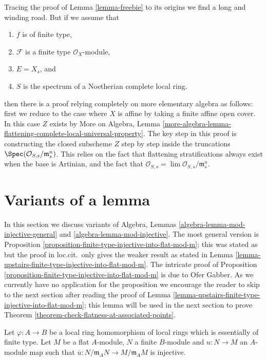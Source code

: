 \begin{remark}
\label{remark-flattening-complete-noetherian}
Tracing the proof of
Lemma \ref{lemma-freebie}
to its origins we find a long and winding road. But if we assume that
\begin{enumerate}
\item $f$ is of finite type,
\item $\mathcal{F}$ is a finite type $\mathcal{O}_X$-module,
\item $E = X_s$, and
\item $S$ is the spectrum of a Noetherian complete local ring.
\end{enumerate}
then there is a proof relying completely on more elementary algebra as
follows: first we reduce to the case where $X$ is affine by taking
a finite affine open cover. In this case $Z$ exists by
More on Algebra,
Lemma \ref{more-algebra-lemma-flattening-complete-local-universal-property}.
The key step in this proof is constructing the closed subscheme $Z$
step by step inside the truncations
$\Spec(\mathcal{O}_{S, s}/\mathfrak m_s^n)$.
This relies on the fact that flattening stratifications always exist
when the base is Artinian, and the fact that
$\mathcal{O}_{S, s} = \lim \mathcal{O}_{S, s}/\mathfrak m_s^n$.
\end{remark}




\section{Variants of a lemma}
\label{section-variants-mod-injective}

\noindent
In this section we discuss variants of
Algebra, Lemmas \ref{algebra-lemma-mod-injective-general} and
\ref{algebra-lemma-mod-injective}.
The most general version is
Proposition \ref{proposition-finite-type-injective-into-flat-mod-m};
this was stated as \cite[Lemma 4.2.2]{GruRay} but the proof in
loc.cit.\ only gives the weaker result as stated in
Lemma \ref{lemma-upstairs-finite-type-injective-into-flat-mod-m}.
The intricate proof of
Proposition \ref{proposition-finite-type-injective-into-flat-mod-m}
is due to Ofer Gabber. As we currently have no application for
the proposition we encourage the reader to skip to the next section
after reading the proof of
Lemma \ref{lemma-upstairs-finite-type-injective-into-flat-mod-m};
this lemma will be used in the next section to prove
Theorem \ref{theorem-check-flatness-at-associated-points}.

\begin{situation}
\label{situation-mod-injective}
Let $\varphi : A \to B$ be a local ring homomorphism of local rings
which is essentially of finite type. Let $M$ be a flat $A$-module,
$N$ a finite $B$-module and $u : N \to M$ an $A$-module map such that
$\overline{u} : N/\mathfrak m_AN \to M/\mathfrak m_AM$ is injective.
\end{situation}

